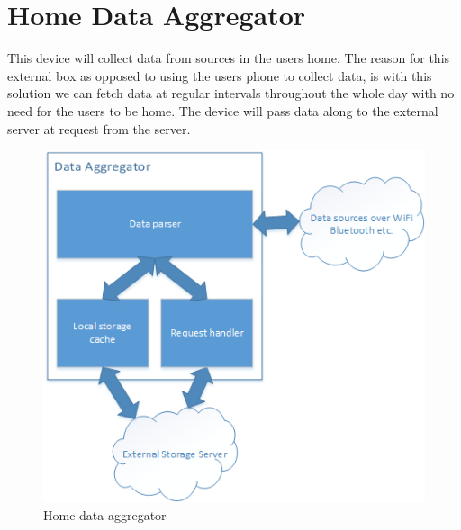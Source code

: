 \section{Home Data Aggregator}
This device will collect data from sources in the users home. The reason for this external box as opposed to using the users phone to collect data, is with this solution we can fetch data at regular intervals throughout the whole day with no need for the users to be home. The device will pass data along to the external server at request from the server.

\begin{figure}[H]
\includegraphics[width=\textwidth]{ch/projectPlan/fig/home.png}
\caption{Home data aggregator}
\end{figure}
